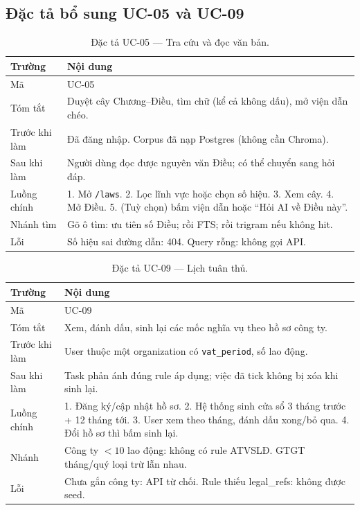 \subsection{Đặc tả bổ sung UC-05 và UC-09}

\begin{table}[htp]
\centering
\caption{Đặc tả UC-05 --- Tra cứu và đọc văn bản.}
\label{tab:uc05}
\begin{tabular}{p{3.2cm}p{10.8cm}}
\toprule
\textbf{Trường} & \textbf{Nội dung} \\
\midrule
Mã & UC-05 \\
Tóm tắt & Duyệt cây Chương--Điều, tìm chữ (kể cả không dấu), mở viện dẫn chéo. \\
Trước khi làm & Đã đăng nhập. Corpus đã nạp Postgres (không cần Chroma). \\
Sau khi làm & Người dùng đọc được nguyên văn Điều; có thể chuyển sang hỏi đáp. \\
Luồng chính & 1. Mở \texttt{/laws}. 2. Lọc lĩnh vực hoặc chọn số hiệu. 3. Xem cây.
4. Mở Điều. 5. (Tuỳ chọn) bấm viện dẫn hoặc ``Hỏi AI về Điều này''. \\
Nhánh tìm & Gõ ô tìm: ưu tiên số Điều; rồi FTS; rồi trigram nếu không hit. \\
Lỗi & Số hiệu sai đường dẫn: 404. Query rỗng: không gọi API. \\
\bottomrule
\end{tabular}
\end{table}

\begin{table}[htp]
\centering
\caption{Đặc tả UC-09 --- Lịch tuân thủ.}
\label{tab:uc09}
\begin{tabular}{p{3.2cm}p{10.8cm}}
\toprule
\textbf{Trường} & \textbf{Nội dung} \\
\midrule
Mã & UC-09 \\
Tóm tắt & Xem, đánh dấu, sinh lại các mốc nghĩa vụ theo hồ sơ công ty. \\
Trước khi làm & User thuộc một organization có \texttt{vat\_period}, số lao động. \\
Sau khi làm & Task phản ánh đúng rule áp dụng; việc đã tick không bị xóa khi sinh lại. \\
Luồng chính & 1. Đăng ký/cập nhật hồ sơ. 2. Hệ thống sinh cửa sổ 3 tháng trước +
12 tháng tới. 3. User xem theo tháng, đánh dấu xong/bỏ qua. 4. Đổi hồ sơ thì
bấm sinh lại. \\
Nhánh & Công ty $< 10$ lao động: không có rule ATVSLĐ. GTGT tháng/quý loại trừ lẫn nhau. \\
Lỗi & Chưa gắn công ty: API từ chối. Rule thiếu legal\_refs: không được seed. \\
\bottomrule
\end{tabular}
\end{table}

